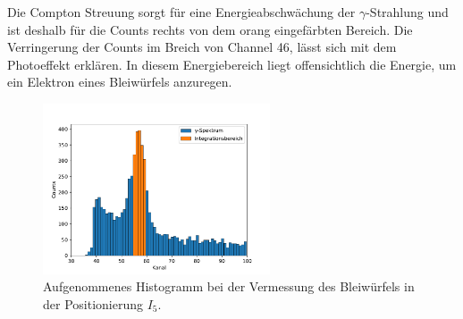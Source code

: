 Die Compton Streuung sorgt für eine Energieabschwächung der $\gamma$-Strahlung und ist deshalb für die Counts rechts von dem
orang eingefärbten Bereich. Die Verringerung der Counts im Breich von Channel 46, lässt sich mit dem Photoeffekt erklären.
In diesem Energiebereich liegt offensichtlich die Energie, um ein Elektron eines Bleiwürfels anzuregen.  %

\begin{figure}[h]
  \centering
  \includegraphics[width=0.6\textwidth]{hist/hist.pdf}
  \caption{Aufgenommenes Histogramm bei der Vermessung des Bleiwürfels in der Positionierung $I_5$.}
  \label{fig: histo}
\end{figure}
